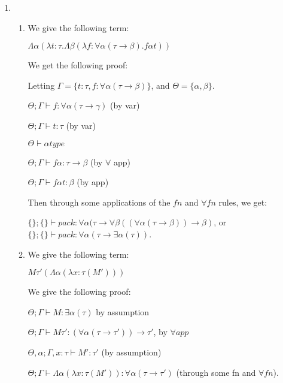 


\begin{enumerate}[label=(\alph*)]
    \item
        \begin{enumerate}[label=(\roman*)]
            \item
                We give the following term:

                $\Lambda \alpha( \lambda t : \tau. \Lambda \beta(\lambda f : \forall \alpha(\tau \rightarrow \beta). f \alpha t))$

                We get the following proof:

                Letting $\Gamma = \{t : \tau, f : \forall \alpha(\tau \rightarrow \beta)\}$, and $\Theta = \{\alpha, \beta\}$.

                $\Theta;\Gamma \vdash f : \forall \alpha(\tau \rightarrow \gamma)$ (by var)

                $\Theta;\Gamma \vdash t : \tau$ (by var)

                $\Theta \vdash \alpha type$

                $\Theta;\Gamma \vdash f \alpha : \tau \rightarrow \beta$ (by $\forall$ app)

                $\Theta;\Gamma \vdash f \alpha t : \beta$ (by app)

                Then through some applications of the $fn$ and $\forall fn$ rules, we get:

                $\{\};\{\} \vdash pack : \forall \alpha (\tau \rightarrow \forall \beta((\forall \alpha(\tau \rightarrow \beta)) \rightarrow \beta)$, or $\{\};\{\} \vdash pack : \forall \alpha (\tau \rightarrow \exists \alpha(\tau))$.

            \item
                We give the following term:

                $M \tau' (\Lambda \alpha(\lambda  x : \tau (M')))$

                We give the following proof:

                $\Theta;\Gamma \vdash M : \exists \alpha(\tau)$ by assumption

                $\Theta;\Gamma \vdash M \tau' : (\forall \alpha (\tau \rightarrow \tau')) \rightarrow \tau'$, by $\forall app$

                $\Theta,\alpha;\Gamma,x:\tau \vdash M' : \tau'$ (by assumption)

                $\Theta;\Gamma \vdash \Lambda \alpha(\lambda x:\tau(M')) : \forall \alpha (\tau \rightarrow \tau')$ (through some fn and $\forall fn$).


\end{enumerate}
\end{enumerate}
